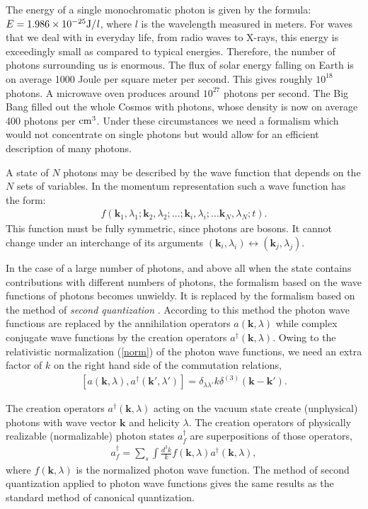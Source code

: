 \documentclass[twocolumn,aps,pra,10pt]{revtex4-1}
\begin{document}
The energy of a single monochromatic photon is given by the formula: $E=1.986\times 10^{-25}\rm{J}/{\it l}$, where $l$ is the wavelength measured in meters.
For waves that we deal with in everyday life, from radio waves to X-rays, this energy is exceedingly small as compared to typical energies. Therefore, the number of photons surrounding us is enormous. The flux of solar energy falling on Earth is on average 1000 Joule per square meter per second. This gives roughly  $10^{18}$ photons. A microwave oven produces around $10^{27}$ photons per second. The Big Bang filled out the whole Cosmos with photons, whose density is now on average 400 photons per $\rm{cm}^3$. Under these circumstances we need a formalism which would not concentrate on single photons but would allow for an efficient description of many photons.

A state of $N$ photons may be described by the wave function that depends on the $N$ sets of variables. In the momentum representation such a wave function has the form:
\begin{align}\label{n}
f({\bm k}_1,\lambda_1;{\bm k}_2,\lambda_2;\dots;{\bm k}_i,\lambda_i;\dots{\bm k}_N,\lambda_N;t).
\end{align}
This function must be fully symmetric, since photons are bosons. It cannot change under an interchange of its arguments $({\bm k}_i,\lambda_i)\leftrightarrow({\bm k}_j,\lambda_j)$.

In the case of a large number of photons, and above all when the state contains contributions with different numbers of photons, the formalism based on the wave functions of photons becomes unwieldy. It is replaced by the formalism based on the method of {\em second quantization} \cite{fw,kobe}. According to this method the photon wave functions are replaced by the annihilation operators $a({\bm k},\lambda)$ while complex conjugate wave functions by the creation operators $a^\dagger({\bm k},\lambda)$. Owing to the relativistic normalization (\ref{norm}) of the photon wave functions, we need an extra factor of $k$ on the right hand side of the commutation relations,
\begin{align}\label{regcom}
[a({\bm k},\lambda),a^\dagger({\bm k}',\lambda')]=\delta_{\lambda\lambda'}k\delta^{(3)}({\bm k}-{\bm k}').
\end{align}

The creation operators $a^\dagger({\bm k},\lambda)$ acting on the vacuum state create (unphysical) photons with wave vector ${\bm k}$ and helicity $\lambda$. The creation operators of physically realizable (normalizable) photon states $a^\dagger_f$ are superpositions of those operators,
\begin{align}\label{coh1}
a^\dagger_f=\sum_{s}\int\frac{d^3k}{k}f({\bm k},\lambda)a^\dagger({\bm k},\lambda),
\end{align}
where $f({\bm k},\lambda)$ is the normalized photon wave function. The method of second quantization applied to photon wave functions gives the same results as the standard method of canonical quantization.
\end{document}
